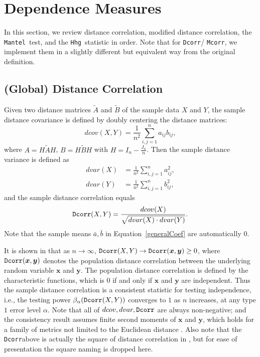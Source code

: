 \documentclass[11pt]{article}
\newcommand{\note}[2][]{\added[#1,remark={#2}]{}}
\providecommand{\sct}[1]{{\sc \texttt{#1}}}
\providecommand{\mb}[1]{\boldsymbol{#1}}
\newcommand{\Hhg}{\sct{Hhg}}
\newcommand{\Dcorr}{\sct{Dcorr}}
\newcommand{\Mcorr}{\sct{Mcorr}}
\newcommand{\Mantel}{\sct{Mantel}}
\newcommand{\cs}[1]{{\note{cs: #1}}}
\begin{document}
\section{Dependence Measures}
\label{appen:methods}

\cs{if we define the generalized correlation coefficient above, then in this section, we should define each measure in terms of what $a_{ij}$ is explicitly. like, each subsection should have an explicit statement/remark: ``Letting X $\leftarrow a_{ij}$, this method is a special case of the generalized correlation coefficient.'' }

In this section, we review distance correlation, modified distance correlation, the \Mantel~test, and the \Hhg~statistic in order. Note that for \Dcorr / \Mcorr, we implement them in a slightly different but equivalent way from the original definition.

\subsection{(Global) Distance Correlation}
\label{appen:dcorr}
Given two distance matrices $\tilde{A}$ and $\tilde{B}$ of the sample data $X$ and $Y$, the sample distance covariance is defined by doubly centering the distance matrices:
\begin{equation}
\label{dcovEqu}
dcov(X,Y)=\frac{1}{n^2}\sum_{i,j=1}^{n}a_{ij}b_{ij},
\end{equation}
where $A=H\tilde{A}H$, $B=H\tilde{B}H$ with $H=I_{n}-\frac{J_{n}}{n}$. Then the sample distance variance is defined as
\begin{align*}
dvar(X) &=\frac{1}{n^2}\sum_{i,j=1}^{n}a_{ij}^{2},\\
dvar(Y) &=\frac{1}{n^2}\sum_{i,j=1}^{n}b_{ij}^{2},
\end{align*}
and the sample distance correlation equals
\begin{equation}
\label{dcorrEqu}
\Dcorr(X,Y)=\frac{dcov(X)}{\sqrt{dvar(X) \cdot dvar(Y)}}.
\end{equation}
Note that the sample means $\bar{a}, \bar{b}$ in Equation~\ref{generalCoef} are automatically $0$.

It is shown in \cite{SzekelyRizzoBakirov2007} that as $n \rightarrow \infty$, $\Dcorr(X,Y) \rightarrow \Dcorr(\mb{x},\mb{y}) \geq 0$, where $\Dcorr(\mb{x},\mb{y})$ denotes the population distance correlation between the underlying random variable $\mb{x}$ and $\mb{y}$. The population distance correlation is defined by the characteristic functions, which is $0$ if and only if $\mb{x}$ and $\mb{y}$ are independent. Thus the sample distance correlation is a consistent statistic for testing independence, i.e., the testing power $\beta_{\alpha}(\Dcorr(X,Y))$ converges to $1$ as $n$ increases, at any type $1$ error level $\alpha$. Note that all of $dcov, dvar, \Dcorr$ are always non-negative; and the consistency result assumes finite second moments of $\mb{x}$ and $\mb{y}$, which holds for a family of metrics not limited to the Euclidean distance \cite{Lyons2013}. Also note that the \Dcorr above is actually the square of distance correlation in \cite{SzekelyRizzoBakirov2007}, but for ease of presentation the square naming is dropped here.
\end{document}
